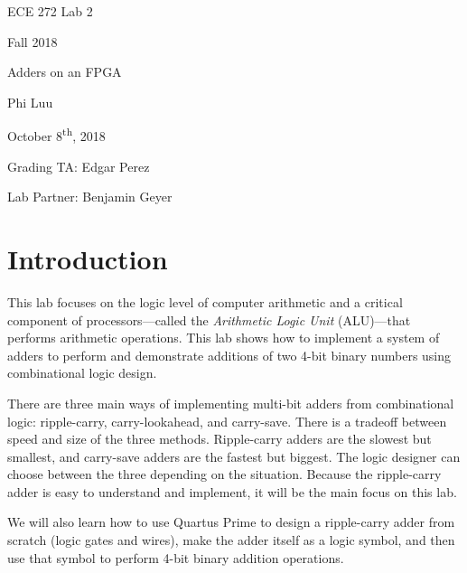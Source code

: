 \documentclass[12pt]{article}
\begin{document}
\begin{titlepage}
    \begin{center} \LARGE
        \vspace*{1.5in}

        ECE 272 Lab 2

        Fall 2018

        \vfill

        Adders on an FPGA

        Phi Luu

        \vfill

        October 8\textsuperscript{th}, 2018

        Grading TA: Edgar Perez

        Lab Partner: Benjamin Geyer

        \vspace{1.5in}
    \end{center}
\end{titlepage}

\section{Introduction}

This lab focuses on the logic level of computer arithmetic and a critical component of processors---called the \textit{Arithmetic Logic Unit} (ALU)---that performs arithmetic operations. This lab shows how to implement a system of adders to perform and demonstrate additions of two 4-bit binary numbers using combinational logic design.

There are three main ways of implementing multi-bit adders from combinational logic: ripple-carry, carry-lookahead, and carry-save. There is a tradeoff between speed and size of the three methods. Ripple-carry adders are the slowest but smallest, and carry-save adders are the fastest but biggest. The logic designer can choose between the three depending on the situation. Because the ripple-carry adder is easy to understand and implement, it will be the main focus on this lab.

We will also learn how to use Quartus Prime to design a ripple-carry adder from scratch (logic gates and wires), make the adder itself as a logic symbol, and then use that symbol to perform 4-bit binary addition operations.
\end{document}
